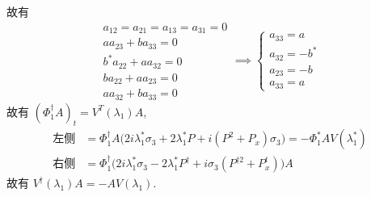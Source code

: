 故有 
\begin{equation}
    \begin{aligned}
        a_{12} = a_{21} = a_{13} = a_{31} = 0 \\
        aa_{23} + ba_{33} = 0 \\
        b^{*}a_{22} + aa_{32} = 0 \\
        ba_{22} + aa_{23} = 0 \\
        aa_{32} + ba_{33} = 0
    \end{aligned}
    \implies
    \begin{cases}
        a_{33} = a \\
        a_{32} = -b^{*} \\
        a_{23} = -b\\
        a_{33} = a
    \end{cases}
\end{equation}
故有 $ (\Phi_{1}^{\dagger} A)_{t} = V^{T}(\lambda_{1})A $, 
\begin{equation}
    \begin{aligned}
        \text{左侧} &= \Phi_{1}^{\dagger}A\big(2i \lambda_{1}^{*} \sigma_{3} + 2 \lambda_{1}^{*}P + i(P^{2} + P_{x})\sigma_{3}\big) = - \Phi_{1}^{*}AV(\lambda_{1}^{*})\\
        \text{右侧} &= \Phi_{1}^{\dagger}\big(2i \lambda_{1}^{*}\sigma_{3} - 2 \lambda_{1}^{*}P^{\dagger} + i\sigma_{3} (P^{\dagger2} + P_{x}^{t})\big) A
    \end{aligned}
\end{equation}
故有 $ V^{\dagger}(\lambda_{1})A = -AV(\lambda_{1}) $.

